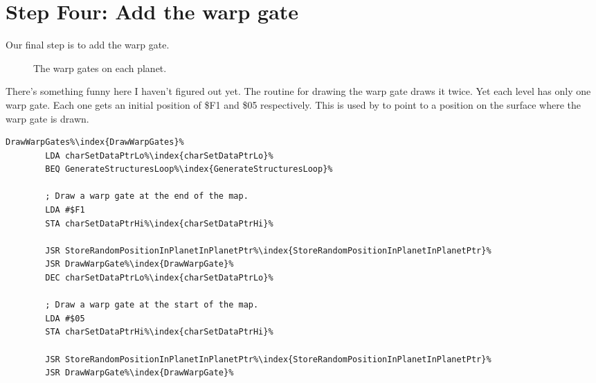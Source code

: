 \section{Step Four: Add the warp gate}

Our final step is to add the warp gate.
\begin{figure}[H]
  {
    \setlength{\tabcolsep}{3.0pt}
    \setlength\cmidrulewidth{\heavyrulewidth} %
    \begin{adjustbox}{width=15cm,center}
      \begin{subfigure}{0.3\textwidth}
        
      \end{subfigure}
      \begin{subfigure}{0.3\textwidth}
        
      \end{subfigure}
      \begin{subfigure}{0.3\textwidth}
        
      \end{subfigure}
      \begin{subfigure}{0.3\textwidth}
        
      \end{subfigure}
      \begin{subfigure}{0.3\textwidth}
        
      \end{subfigure}
    \end{adjustbox}
  }\caption[]{The warp gates on each planet.}
\end{figure}

There's something funny here I haven't figured out yet. The routine for drawing the warp gate
draws it twice. Yet each level has only one warp gate. Each one gets an initial position of
\$F1 and \$05 respectively. This is used by  to 
point to a position on the surface where the warp gate is drawn.

\begin{lstlisting}[caption=Why does it draw 2 warp gates when there's only 1? Haven't figured this out yet..,escapechar=\%]
DrawWarpGates%\index{DrawWarpGates}%   
        LDA charSetDataPtrLo%\index{charSetDataPtrLo}%
        BEQ GenerateStructuresLoop%\index{GenerateStructuresLoop}%

        ; Draw a warp gate at the end of the map.
        LDA #$F1
        STA charSetDataPtrHi%\index{charSetDataPtrHi}%

        JSR StoreRandomPositionInPlanetInPlanetPtr%\index{StoreRandomPositionInPlanetInPlanetPtr}%
        JSR DrawWarpGate%\index{DrawWarpGate}%
        DEC charSetDataPtrLo%\index{charSetDataPtrLo}%

        ; Draw a warp gate at the start of the map.
        LDA #$05
        STA charSetDataPtrHi%\index{charSetDataPtrHi}%

        JSR StoreRandomPositionInPlanetInPlanetPtr%\index{StoreRandomPositionInPlanetInPlanetPtr}%
        JSR DrawWarpGate%\index{DrawWarpGate}%
\end{lstlisting}

